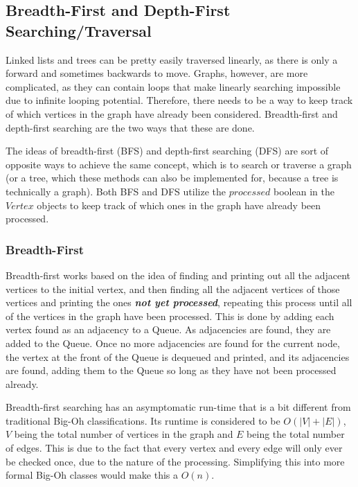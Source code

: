 \documentclass[letterpaper, 10pt,DIV=13]{scrartcl}
\numberwithin{equation}{section} %
\numberwithin{figure}{section} %
\numberwithin{table}{section} %
\begin{document}
\subsection{Breadth-First and Depth-First Searching/Traversal}
Linked lists and trees can be pretty easily traversed linearly, as there is only a forward and sometimes backwards to move. Graphs, however, are more complicated, as they can contain loops that make linearly searching impossible due to infinite looping potential. Therefore, there needs to be a way to keep track of which vertices in the graph have already been considered. Breadth-first and depth-first searching are the two ways that these are done.

The ideas of breadth-first (BFS) and depth-first searching (DFS) are sort of opposite ways to achieve the same concept, which is to search or traverse a graph (or a tree, which these methods can also be implemented for, because a tree is technically a graph). Both BFS and DFS utilize the $processed$ boolean in the $Vertex$ objects to keep track of which ones in the graph have already been processed. 

\subsubsection{Breadth-First}
Breadth-first works based on the idea of finding and printing out all the adjacent vertices to the initial vertex, and then finding all the adjacent vertices of those vertices and printing the ones \textit{\textbf{not yet processed}}, repeating this process until all of the vertices in the graph have been processed. This is done by adding each vertex found as an adjacency to a Queue. As adjacencies are found, they are added to the Queue. Once no more adjacencies are found for the current node, the vertex at the front of the Queue is dequeued and printed, and its adjacencies are found, adding them to the Queue so long as they have not been processed already.

Breadth-first searching has an asymptomatic run-time that is a bit different from traditional Big-Oh classifications. Its runtime is considered to be $O(|V| + |E|)$, $V$ being the total number of vertices in the graph and $E$ being the total number of edges. This is due to the fact that every vertex and every edge will only ever be checked once, due to the nature of the processing. Simplifying this into more formal Big-Oh classes would make this a $O(n)$.
\end{document}
